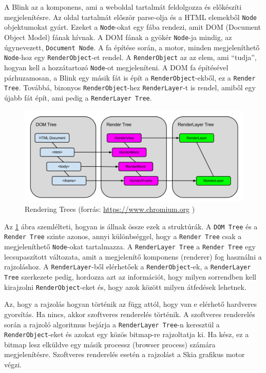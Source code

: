 \documentclass[12pt]{report}
\let\origurl\url
\renewcommand{\url}[1]{%
    \textcolor{blue}{\origurl{#1}}
}
\begin{document}
A Blink az a komponens, ami a weboldal tartalmát feldolgozza és előkészíti megjelenítésre.
Az oldal tartalmát először parse-olja és a HTML elemekből \texttt{Node} objektumokat gyárt.
Ezeket a \texttt{Node}-okat egy fába rendezi, amit DOM (Document Object Model) fának hívnak.
A DOM fának a gyökér \texttt{Node}-ja mindig, az úgynevezett, \texttt{Document Node}.
A fa építése során, a motor, minden megjeleníthető \texttt{Node}-hoz egy
\texttt{RenderObject}-et rendel. A \texttt{RenderObject} az az elem, ami ``tudja'',
hogyan kell a hozzátartozó \texttt{Node}-ot megjeleníteni.
A DOM fa építésével párhuzamosan, a Blink egy másik fát is épít a
\texttt{RenderObject}-ekből, ez a \texttt{Render Tree}. Továbbá, bizonyos
\texttt{RenderObject}-hez \texttt{RenderLayer}-t is rendel, amiből egy újabb fát épít,
ami pedig a \texttt{RenderLayer Tree}.

\begin{figure}[h]
    \centering
    \includegraphics[scale=0.46]{rendering-trees}
    \caption{
        \label{fig:rendering-trees}
        Rendering Trees (forrás: \url{https://www.chromium.org} \cite{bib:chromium-oopifs})
    }
\end{figure}

\noindent
Az \ref{fig:rendering-trees} ábra szemlélteti, hogyan is állnak össze ezek a struktúrák.
A \texttt{DOM Tree} és a \texttt{Render Tree} szinte azonos, annyi különbséggel, hogy
a \texttt{Render Tree} csak a megjeleníthető \texttt{Node}-okat tartalmazza.
A \texttt{RenderLayer Tree} a \texttt{Render Tree} egy lecsupaszított változata, amit a
megjelenítő komponens (renderer) fog használni a rajzoláshoz.
A \texttt{RenderLayer}-ből elérhetőek a \texttt{RenderObject}-ek, a \texttt{RenderLayer Tree}
szerkezete pedig, hordozza azt az információt, hogy milyen sorrendben kell kirajzolni
\texttt{RenderObject}-eket és, hogy azok között milyen átfedések lehetnek.

Az, hogy a rajzolás hogyan történik az függ attól, hogy van e elérhető hardveres gyorsítás.
Ha nincs, akkor szoftveres renderelés történik. A szoftveres renderelés során a rajzoló
algoritmus bejárja a \texttt{RenderLayer Tree}-n keresztül a \texttt{RenderObject}-eket és
azokat egy közös bitmap-re rajzoltatja ki. Ha kész, ez a bitmap lesz elküldve egy másik
processz (browser process) számára megjelenítésre. Szoftveres renderelés esetén a rajzolást
a Skia grafikus motor végzi.
\end{document}
